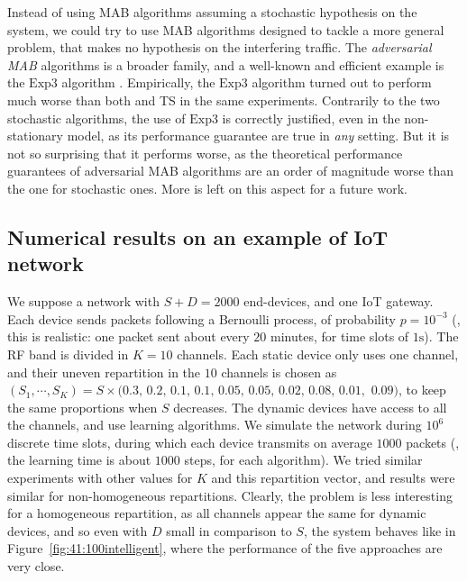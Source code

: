 Instead of using MAB algorithms assuming a stochastic hypothesis on the system, we could try to use MAB algorithms designed to tackle a more general problem, that makes no hypothesis on the interfering traffic.
The \emph{adversarial MAB} algorithms is a broader family, and a well-known and efficient example is the $\mathrm{Exp}3$ algorithm \cite{Bubeck12}.
Empirically, the $\mathrm{Exp}3$ algorithm turned out to perform much worse than both \UCB{} and TS in the same experiments.
Contrarily to the two stochastic algorithms, the use of $\mathrm{Exp}3$ is correctly justified, even in the non-stationary model, as its performance guarantee are true in \emph{any} setting.
But it is not so surprising that it performs worse, as the theoretical performance guarantees of adversarial MAB algorithms are an order of magnitude
worse than the one for stochastic ones.
More is left on this aspect for a future work.



\subsection{Numerical results on an example of IoT network}\label{sub:41:numericalResults}

We suppose a network with $S + D = 2000$ end-devices, and one IoT gateway.
Each device sends packets following a Bernoulli process, of probability $p = 10^{-3}$ (\eg, this is realistic: one packet sent about every $20$ minutes, for time slots of $1\mathrm{s}$).
The RF band is divided in $K = 10$ channels.
Each static device only uses one channel, and their uneven repartition in the $10$ channels is chosen as $(S_1,\cdots, S_{K}) = S \times (0.3, \, 0.2, \, 0.1, \, 0.1, \, 0.05, \, 0.05, \, 0.02, \, 0.08, \, 0.01,$ $0.09)$, to keep the same proportions when $S$ decreases. The dynamic devices have access to all the channels, and use learning algorithms.
%
We simulate the network during $10^6$ discrete time slots, during which each device transmits on average $1000$ packets (\ie, the learning time is about $1000$ steps, for each algorithm).
We tried similar experiments with other values for $K$ and this repartition vector, and results were similar for non-homogeneous repartitions. Clearly, the problem is less interesting for a homogeneous repartition, as all channels appear the same for dynamic devices, and so even with $D$ small in comparison to $S$, the system behaves like in Figure~\ref{fig:41:100intelligent}, where the performance of the five approaches are very close.

